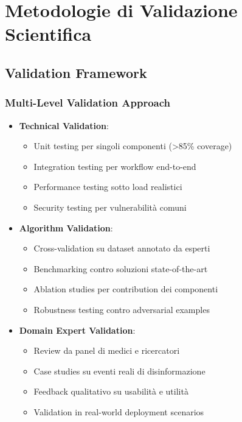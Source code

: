 \documentclass[12pt,a4paper]{report}
\begin{document}
\section{Metodologie di Validazione Scientifica}

\subsection{Validation Framework}

\subsubsection{Multi-Level Validation Approach}

\begin{itemize}
    \item \textbf{Technical Validation}:
    \begin{itemize}
        \item Unit testing per singoli componenti (>85\% coverage)
        \item Integration testing per workflow end-to-end
        \item Performance testing sotto load realistici
        \item Security testing per vulnerabilità comuni
    \end{itemize}
    
    \item \textbf{Algorithm Validation}:
    \begin{itemize}
        \item Cross-validation su dataset annotato da esperti
        \item Benchmarking contro soluzioni state-of-the-art
        \item Ablation studies per contribution dei componenti
        \item Robustness testing contro adversarial examples
    \end{itemize}
    
    \item \textbf{Domain Expert Validation}:
    \begin{itemize}
        \item Review da panel di medici e ricercatori
        \item Case studies su eventi reali di disinformazione
        \item Feedback qualitativo su usabilità e utilità
        \item Validation in real-world deployment scenarios
    \end{itemize}
\end{itemize}
\end{document}
